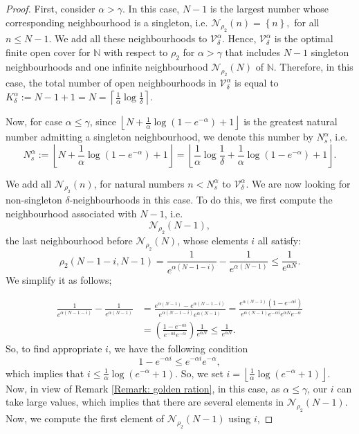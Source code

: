 \documentclass[11pt, reqno]{amsart}
\theoremstyle{plain}%
\theoremstyle{definition}
\theoremstyle{definition}
\def\N{\ensuremath{\mathbb N}}
\numberwithin{equation}{section}
\begin{document}
\begin{proof}
 First, consider $\alpha>\gamma$. In this case, $N-1$ is the largest number whose corresponding neighbourhood is a singleton, i.e. $\mathcal{N}_{\rho_2}(n)=\left\{n\right\},$ for all $n\le N-1$. We add all these neighbourhoods to $\mathcal{V}_\delta^{\alpha}$. Hence, $\mathcal{V}_\delta^{\alpha}$ is the optimal finite open cover for $\N$ with respect to ${\rho_2}$ for ${\alpha>\gamma}$ that includes $N-1$ singleton neighbourhoods and one infinite neighbourhood $\mathcal{N}_{\rho_2}(N)$ of $\N$. Therefore, in this case, the total number of open neighbourhoods in $\mathcal{V}_\delta^{\alpha}$ is equal to $K_\delta^{\alpha}:=N-1+1=N=\left\lceil \frac{1}{\alpha}\log\frac{1}{\delta}\right\rceil$.


 Now, for case $\alpha\le \gamma$, since $\left\lfloor N+\frac{1}{\alpha}\log(1-e^{-\alpha}) +1 \right\rfloor$ is the greatest natural number admitting a singleton neighbourhood, we denote this number by $N_s^{\alpha}$, i.e. $$N_s^{\alpha}:=\left\lfloor N+\frac{1}{\alpha}\log(1-e^{-\alpha}) +1 \right\rfloor= \left\lfloor \frac{1}{\alpha}\log\frac{1}{\delta}+\frac{1}{\alpha}\log(1-e^{-\alpha})+1  \right\rfloor.$$

We add all $\mathcal{N}_{\rho_2}(n)$, for natural numbers $n<N_s^{\alpha}$ to $\mathcal{V}_\delta^{\alpha}$. We are now looking for non-singleton $\delta$-neighbourhoods in this case. To do this, we first compute the neighbourhood associated with $N-1$, i.e. $$\mathcal{N}_{\rho_2}(N-1),$$ the last neighbourhood before $\mathcal{N}_{\rho_2}(N)$, whose elements $i$ all satisfy: 
$${\rho_2}(N-1-i,N-1)=\frac{1}{e^{\alpha(N-1-i)}}-\frac{1}{e^{\alpha(N-1)}}\le \frac{1}{e^{\alpha N}}.$$
We simplify it as follows;

\begin{align*}
\frac{1}{e^{\alpha(N-1-i)}}-\frac{1}{e^{\alpha(N-1)}}&= \frac{e^{\alpha(N-1)}-e^{\alpha(N-1-i)}}{e^{\alpha(N-1-i)}e^{\alpha(N-1)}}=\frac{e^{\alpha(N-1)}(1-e^{-\alpha i})}{e^{\alpha(N-1)}e^{-\alpha i}e^{\alpha N}e^{-\alpha }}\\&= \left(\frac{1-e^{-\alpha i}}{e^{-\alpha i}e^{-\alpha }}\right)\frac{1}{e^{\alpha N}} \le \frac{1}{e^{\alpha N}}.\end{align*}
So, to find appropriate $i$, we have the following condition
$$ 1-e^{-\alpha i}\le e^{-\alpha i}e^{-\alpha },$$
which implies that $i\le\frac{1}{\alpha}\log\left(e^{-\alpha}+1\right)$. So, we set $i=\left\lfloor\frac{1}{\alpha}\log\left(e^{-\alpha}+1\right)\right\rfloor$. Now, in view of Remark \ref{Remark: golden ration}, in this case, as $\alpha\le\gamma$, our $i$ can take large values, which implies that there are several elements in $\mathcal{N}_{\rho_2}(N-1)$. Now, we compute the first element of $\mathcal{N}_{\rho_2}(N-1)$ using $i$,


\end{proof}
\end{document}
